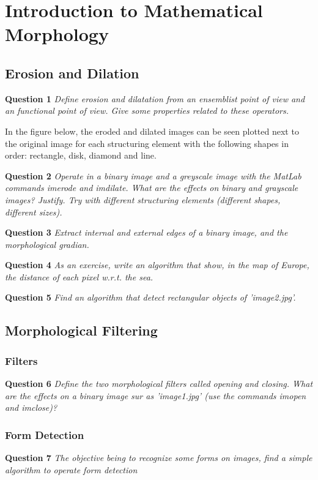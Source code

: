 \section{Introduction to Mathematical Morphology}
\label{sec:introduction_to_mathematical_morphology}



\setcounter{subsection}{1}
\subsection{Erosion and Dilation}
\textbf{Question 1} \textit{Deﬁne erosion and dilatation from an ensemblist point of view and an functional point of view. Give some properties related to these operators.}

In the figure below, the eroded and dilated images can be seen plotted next to the original image for each structuring element with the following shapes in order: rectangle, disk, diamond and line.

\textbf{Question 2} \textit{Operate in a binary image and a greyscale image with the MatLab commands imerode and imdilate. What are the eﬀects on binary and grayscale images? Justify. Try with diﬀerent structuring elements (diﬀerent shapes, diﬀerent sizes).}


\textbf{Question 3} \textit{Extract internal and external edges of a binary image, and the morphological gradian.}



\textbf{Question 4} \textit{As an exercise, write an algorithm that show, in the map of Europe, the distance of each pixel w.r.t. the sea.}


\textbf{Question 5} \textit{Find an algorithm that detect rectangular objects of ’image2.jpg’.}



\subsection{Morphological Filtering}
\subsubsection{Filters}
\textbf{Question 6} \textit{Deﬁne the two morphological ﬁlters called opening and closing. What are the eﬀects on a binary image sur as ’image1.jpg’ (use the commands imopen and imclose)?}

\subsubsection{Form Detection}
\textbf{Question 7} \textit{The objective being to recognize some forms on images, ﬁnd a simple algorithm to operate form detection}

